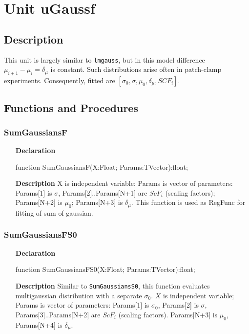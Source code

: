 \documentclass[12pt,a4paper,oneside]{report}
\newcommand{\lmath}[1]{   %
	\marginpar{\vspace{#1} 
		\begin{flushright}
			LMath
	\end{flushright} }
}
\newcommand{\declarationitem}[1]{\textbf{#1}}
\newcommand{\descriptiontitle}[1]{\textbf{#1}}
\newcommand{\code}[1]{\texttt{#1}}
\begin{document}
\section{Unit uGaussf}\lmath{-24pt}
\label{ugaussf}
\subsection{Description}
This unit is largely similar to \code{lmgauss}, but in this model difference $\mu_{i+1} - \mu_{i} = \delta_{\mu}$ is constant. Such distributions arise often in patch-clamp experiments. Consequently, fitted are $[\sigma_0,\sigma, \mu_0,\delta_{\mu},SCF_i]$.
\subsection{Functions and Procedures}
\subsubsection{SumGaussiansF}
\label{ugaussf-SumGaussiansF}
\begin{itemize}
	\item[\declarationitem{Declaration}\hfill]
	\begin{flushleft}
		\begin{ttfamily}
			function SumGaussiansF(X:Float; Params:TVector):float;
		\end{ttfamily}
	\end{flushleft}
	\par
	\item[\descriptiontitle{Description}]
	X is independent variable; Params is vector of parameters: Params[1] is $\sigma$, Params[2]..Params[N+1] are $ScF_i$ (scaling factors); Params[N+2] is $\mu_0$; Params[N+3] is $\delta_{\mu}$. This function is used as RegFunc for fitting of sum of gaussian. 
\end{itemize}

\subsubsection{SumGaussiansFS0}
\label{ugaussf-SumGaussiansFS0}
\begin{itemize}\item[\declarationitem{Declaration}\hfill]
	\begin{flushleft}
		\begin{ttfamily}
			function SumGaussiansFS0(X:Float; Params:TVector):float;
		\end{ttfamily}
	\end{flushleft}
	\par
	\item[\descriptiontitle{Description}]
	Similar to \code{SumGaussiansS0}, this function evaluates multigaussian distribution with a separate $\sigma_0$. $X$ is independent variable; Params is vector of parameters: Params[1] is $\sigma_0$, Params[2] is $\sigma$, Params[3]..Params[N+2] are $ScF_i$ (scaling factors). Params[N+3] is $\mu_0$, Params[N+4] is $\delta_{\mu}$.
	
\end{itemize}
\end{document}
